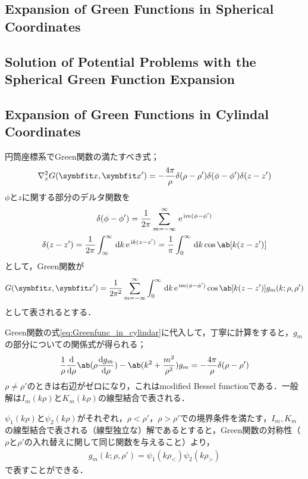 \subsection{Expansion of Green Functions in Spherical Coordinates}
\subsection{Solution of Potential Problems with the Spherical Green Function Expansion}
\subsection{Expansion of Green Functions in Cylindal Coordinates}
円筒座標系でGreen関数の満たすべき式；
\begin{gather}
   \label{eq:Greenfunc_in_cylindar}
  \gr^2_x G(\bs{x}, \bs{x}') = -\frac{4\pi}{\rho} \delta(\rho - \rho') \delta(\phi - \phi') \delta (z - z')
\end{gather}
$\phi$と$z$に関する部分のデルタ関数を
\begin{gather}
  \delta(\phi - \phi') = \frac{1}{2\pi} \sum_{m=-\infty}^{\infty} \e^{\i m(\phi - \phi')}\\
\delta(z - z') = \frac{1}{2\pi} \int_\infty^\infty \dl{k} \e^{\i k(z-z')}  = \frac{1}{\pi} \int_0^\infty \dl{k}\cos\ab[k(z-z')]
\end{gather}
として，Green関数が
\begin{gather}  
  G(\bs{x}, \bs{x}') = \frac{1}{2\pi^2} \sum_{m=-\infty}^{\infty} \int_0^\infty \dl{k} \e^{\i m(\phi-\phi')} \cos \ab[k(z - z')] g_m(k; \rho, \rho')
\end{gather}
として表されるとする．

Green関数の式\eqref{eq:Greenfunc_in_cylindar}に代入して，丁寧に計算をすると，$g_m$の部分についての関係式が得られる；
\begin{gather}
  \label{eq:Greenfunc_cylindar_radius}
  \frac{1}{\rho} \diff**{\rho}{\ab(\rho\diff{g_m}{\rho})} - \ab(k^2 + \frac{m^2}{\rho^2})g_m = -\frac{4\pi}{\rho} \delta (\rho - \rho')
\end{gather}
$\rho \neq \rho'$のときは右辺がゼロになり，これはmodified Bessel functionである．一般解は$I_m(k\rho)$と$K_m(k\rho)$の線型結合で表される．

$\psi_1(k\rho)$と$\psi_2(k\rho)$がそれぞれ，$\rho < \rho'$，$\rho > \rho'$での境界条件を満たす，$I_m, K_m$の線型結合で表される（線型独立な）解であるとすると，Green関数の対称性（$\rho$と$\rho'$の入れ替えに関して同じ関数を与えること）より，
\begin{gather}
  \label{eq:Greenfunc_cylindar_radius_psi}
  g_m(k; \rho, \rho') = \psi_1(k\rho_<)\psi_2(k\rho_>)
\end{gather}
で表すことができる．

